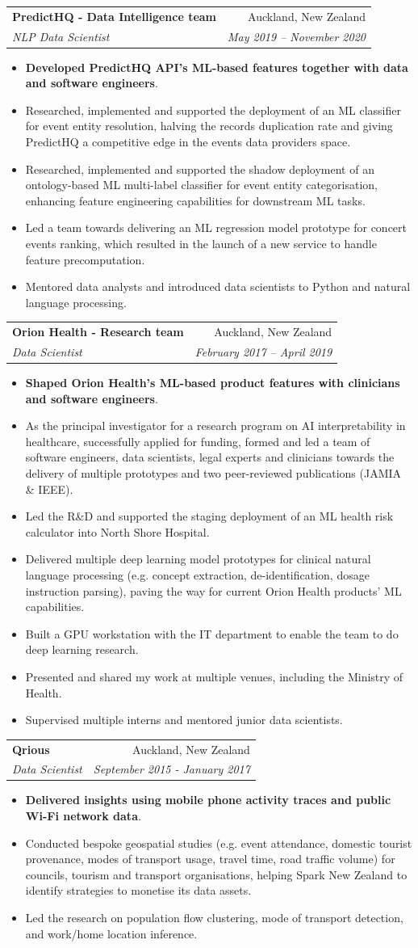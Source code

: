 \documentclass[letterpaper,11pt]{article}
\makeatletter
\newcommand{\resumeItemBis}[2]{
  \item\small{
    \textbf{#1}{#2 \vspace{-2pt}}
  }
}
\newcommand{\resumeSubheading}[4]{
  \vspace{-1pt}\item
    \begin{tabular*}{0.97\textwidth}[t]{l@{\extracolsep{\fill}}r}
      \textbf{#1} & #2 \\
      \textit{\small#3} & \textit{\small #4} \\
    \end{tabular*}\vspace{-5pt}
}
\newcommand{\resumeItemListStart}{\begin{itemize}}
\newcommand{\resumeItemListEnd}{\end{itemize}\vspace{-5pt}}
\makeatother
\begin{document}
	\resumeSubheading
      {PredictHQ - Data Intelligence team}{Auckland, New Zealand}
      {NLP Data Scientist}{May 2019 -- November 2020}
      \resumeItemListStart
        \resumeItemBis{Developed PredictHQ API's ML-based features together with data and software engineers}{.}
          \resumeItemBis{} {Researched, implemented and supported the deployment of an ML classifier for event entity resolution, halving the records duplication rate and giving PredictHQ a competitive edge in the events data providers space.}
          \resumeItemBis{} {Researched, implemented and supported the shadow deployment of an ontology-based ML multi-label classifier for event entity categorisation, enhancing feature engineering capabilities for downstream ML tasks.}
          \resumeItemBis{} {Led a team towards delivering an ML regression model prototype for concert events ranking, which resulted in the launch of a new service to handle feature precomputation.}
          \resumeItemBis{} {Mentored data analysts and introduced data scientists to Python and natural language processing.}
        \resumeItemListEnd	
	
    \resumeSubheading
      {Orion Health - Research team}{Auckland, New Zealand}
      {Data Scientist}{February 2017 -- April 2019}
      \resumeItemListStart
        \resumeItemBis{Shaped Orion Health’s ML-based product features with clinicians and software engineers}{.}
        \resumeItemBis{} {As the principal investigator for a research program on AI interpretability in healthcare, successfully applied for funding, formed and led a team of software engineers, data scientists, legal experts and clinicians towards the delivery of multiple prototypes and two peer-reviewed publications (JAMIA \& IEEE).}
        \resumeItemBis{} {Led the R\&D and supported the staging deployment of an ML health risk calculator into North Shore Hospital.}
        \resumeItemBis{} {Delivered multiple deep learning model prototypes for clinical natural language processing (e.g. concept extraction, de-identification, dosage instruction parsing), paving the way for current Orion Health products' ML capabilities.}
        \resumeItemBis{} {Built a GPU workstation with the IT department to enable the team to do deep learning research.}
        \resumeItemBis{} {Presented and shared my work at multiple venues, including the Ministry of Health.}
        \resumeItemBis{} {Supervised multiple interns and mentored junior data scientists.}
      \resumeItemListEnd

    \resumeSubheading
      {Qrious}{Auckland, New Zealand}
      {Data Scientist}{September 2015 - January 2017}
      \resumeItemListStart
        \resumeItemBis{Delivered insights using mobile phone activity traces and public Wi-Fi network data}{.}
        \resumeItemBis{} {Conducted bespoke geospatial studies (e.g. event attendance, domestic tourist provenance, modes of transport usage, travel time, road traffic volume) for councils, tourism and transport organisations, helping Spark New Zealand to identify strategies to monetise its data assets.}
        \resumeItemBis{} {Led the research on population flow clustering, mode of transport detection, and work/home location inference.}
      \resumeItemListEnd
\end{document}
